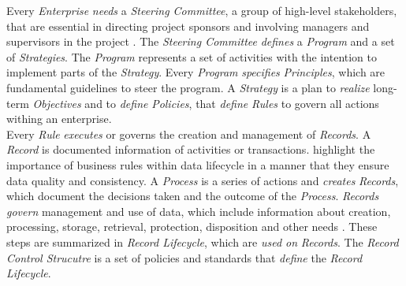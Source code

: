 \documentclass[
  a4paper,  %
  twoside,  %
  bibliography=totoc,
  headsepline,
  cleardoublepage=empty,
  parskip=half,
  draft=false
]{scrbook}
\begin{document}
Every \textit{Enterprise} \textit{needs} a \textit{Steering Committee}, a group of high-level stakeholders, that are essential in directing project sponsors and involving managers and supervisors in the project \cite{Simard2014Governance}. The \textit{Steering Committee} \textit{defines} a \textit{Program} and a set of \textit{Strategies}. The \textit{Program} represents a set of activities with the intention to implement parts of the \textit{Strategy}. Every \textit{Program} \textit{specifies} \textit{Principles}, which are fundamental guidelines to steer the program. A \textit{Strategy} is a plan to \textit{realize} long-term \textit{Objectives} and to \textit{define} \textit{Policies}, that \textit{define} \textit{Rules} to govern all actions withing an enterprise. \\

Every \textit{Rule} \textit{executes} or governs the creation and management of \textit{Records}. A \textit{Record} is documented information of activities or transactions. \cite{Haider2013Improving} highlight the importance of business rules within data lifecycle in a manner that they ensure data quality and consistency. A \textit{Process} is a series of actions and \textit{creates} \textit{Records}, which document the decisions taken and the outcome of the \textit{Process}. \textit{Records} \textit{govern} management and use of data, which include information about creation, processing, storage, retrieval, protection, disposition and other needs \cite{Benedon2010History}. These steps are summarized in \textit{Record Lifecycle}, which are \textit{used on} \textit{Records}. The \textit{Record Control Strucutre} is a set of policies and standards that \textit{define} the \textit{Record Lifecycle}. \\
\end{document}
